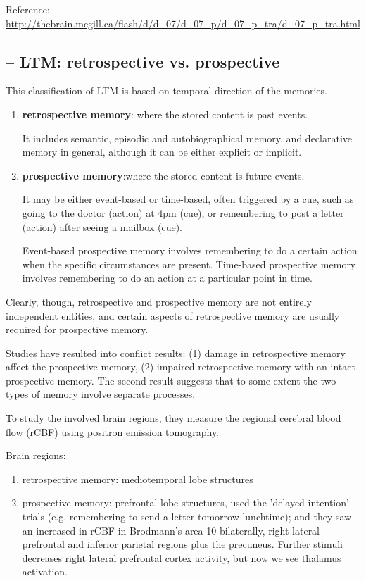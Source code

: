   
Reference:
\url{http://thebrain.mcgill.ca/flash/d/d_07/d_07_p/d_07_p_tra/d_07_p_tra.html}

\subsection{-- LTM: retrospective vs. prospective}
\label{sec:retrospective-memory}
\label{sec:prospective-memory}

This classification of LTM is based on 
temporal direction of the memories.

\begin{enumerate}
  \item {\bf retrospective memory}: where the stored content is past events.
  
  It includes semantic, episodic and autobiographical memory, and declarative
  memory in general, although it can be either explicit or implicit.
  
  \item {\bf prospective memory}:where the stored content is future events.
  
  It may be either event-based or time-based, often triggered by a cue, such as
  going to the doctor (action) at 4pm (cue), or remembering to post a letter
  (action) after seeing a mailbox (cue).
  
  Event-based prospective memory involves remembering to do a certain action
  when the specific circumstances are present. Time-based prospective memory
  involves remembering to do an action at a particular point in time.
  
\end{enumerate}

Clearly, though, retrospective and prospective memory are not entirely
independent entities, and certain aspects of retrospective memory are usually
required for prospective memory.

Studies have resulted into conflict results: (1) damage in retrospective memory
affect the prospective memory, (2) impaired retrospective memory with an intact
prospective memory. The second result suggests that to some extent the two types
of memory involve separate processes.

To study the involved brain regions, they measure the regional cerebral blood
flow (rCBF) using positron emission tomography.

Brain regions:
\begin{enumerate}
  \item retrospective memory: mediotemporal lobe structures
  
  \item prospective memory: prefrontal lobe structures, \citep{burgess2001} used
  the 'delayed intention' trials (e.g. remembering to  send  a   letter  
  tomorrow   lunchtime); and they  saw an increased in rCBF in
  Brodmann's area 10 bilaterally, right lateral prefrontal and inferior
  parietal regions plus the precuneus.
  Further stimuli decreases right lateral prefrontal cortex activity, but now
  we see thalamus activation.
  
\end{enumerate}

